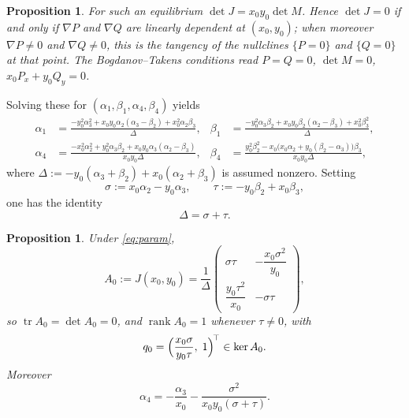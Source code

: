 \documentclass[12pt]{article}
\theoremstyle{plain}
\newtheorem{proposition}[theorem]{Proposition}
\theoremstyle{definition}
\theoremstyle{remark}
\newcommand{\tr}{\operatorname{tr}}
\DeclareMathOperator{\dt}{det}
\DeclareMathOperator{\rank}{rank}
\begin{document}
	\begin{proposition}\label{prop:tangency}
		For such an equilibrium $\dt J=x_{0}y_{0}\dt M$.  Hence $\dt J=0$ if
		and only if $\nabla P$ and $\nabla Q$ are linearly dependent at
		$(x_{0},y_{0})$; when moreover $\nabla P\neq0$ and $\nabla Q\neq0$,
		this is the tangency of the nullclines $\{P=0\}$ and $\{Q=0\}$ at that
		point.  The Bogdanov--Takens conditions read
		$P=Q=0$, $\dt M=0$, $x_{0}P_{x}+y_{0}Q_{y}=0$.
	\end{proposition}
	
	Solving these for $(\alpha_{1},\beta_{1},\alpha_{4},\beta_{4})$ yields
	\begin{equation}\label{eq:param}
		\begin{aligned}
			\alpha_{1} &= \frac{-y_{0}^{2}\alpha_{3}^{2}
				+ x_{0}y_{0}\alpha_{2}(\alpha_{3}-\beta_{2})
				+ x_{0}^{2}\alpha_{2}\beta_{3}}{\Delta},
			&
			\beta_{1} &= \frac{-y_{0}^{2}\alpha_{3}\beta_{2}
				+ x_{0}y_{0}\beta_{2}(\alpha_{2}-\beta_{3})
				+ x_{0}^{2}\beta_{3}^{2}}{\Delta},
			\\[4pt]
			\alpha_{4} &= \frac{-x_{0}^{2}\alpha_{2}^{2}
				+ y_{0}^{2}\alpha_{3}\beta_{2}
				+ x_{0}y_{0}\alpha_{3}(\alpha_{2}-\beta_{3})}{x_{0}y_{0}\Delta},
			&
			\beta_{4} &= \frac{y_{0}^{2}\beta_{2}^{2}
				- x_{0}\bigl(x_{0}\alpha_{2}+y_{0}(\beta_{2}-\alpha_{3})\bigr)\beta_{3}}
			{x_{0}y_{0}\Delta},
		\end{aligned}
	\end{equation}
	where $\Delta:=-y_{0}(\alpha_{3}+\beta_{2})+x_{0}(\alpha_{2}+\beta_{3})$
	is assumed nonzero.  Setting
	\begin{equation}\label{eq:sigmatau}
		\sigma:=x_{0}\alpha_{2}-y_{0}\alpha_{3},
		\qquad
		\tau:=-y_{0}\beta_{2}+x_{0}\beta_{3},
	\end{equation}
	one has the identity
	\begin{equation}\label{eq:Delta}
		\Delta=\sigma+\tau .
	\end{equation}
	
	\begin{proposition}\label{prop:A0}
		Under \eqref{eq:param},
		\begin{equation}\label{eq:A0}
			A_{0}:=J(x_{0},y_{0})=\frac{1}{\Delta}
			\begin{pmatrix}
				\sigma\tau & -\dfrac{x_{0}\sigma^{2}}{y_{0}}\\[8pt]
				\dfrac{y_{0}\tau^{2}}{x_{0}} & -\sigma\tau
			\end{pmatrix},
		\end{equation}
		so $\tr A_{0}=\dt A_{0}=0$, and $\rank A_{0}=1$ whenever $\tau\neq0$,
		with
		\begin{equation}\label{eq:q0}
			q_{0}=\Bigl(\frac{x_{0}\sigma}{y_{0}\tau},\;1\Bigr)^{\!\top}
			\in\ker A_{0}.
		\end{equation}
		Moreover
		\begin{equation}\label{eq:alpha4}
			\alpha_{4}=-\frac{\alpha_{3}}{x_{0}}
			-\frac{\sigma^{2}}{x_{0}y_{0}(\sigma+\tau)} .
		\end{equation}
	\end{proposition}
	
\end{document}
